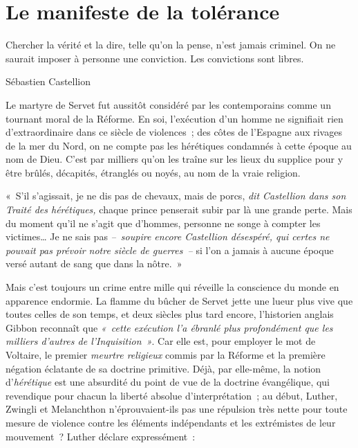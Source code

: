 \documentclass[french,twoside]{book} %
\newcommand{\bibl}[1]{{\smallskip\RaggedLeft\normalsize\normalfont #1\par\medskip}}}
\newenvironment{epigraph}{\begin{addmargin}[2\parindent]{0em}\sffamily\large\setstretch{0.95}}{\end{addmargin}\bigskip}
\newenvironment{quoteblock}%
  {\begin{quoting}}
  {\end{quoting}}
\newcommand\chapteropen{} %
\newcommand\chaptercont{} %
\newenvironment{quotebar}{%
    \def\FrameCommand{{\color{rubric!10!}\vrule width 0.5em} \hspace{0.9em}}%
    \def\OuterFrameSep{0pt} %
    \MakeFramed {\advance\hsize-\width \FrameRestore}
  }%
  {%
    \endMakeFramed
  }
\renewenvironment{quoteblock}%
  {%
    \savenotes
    \setstretch{0.9}
    \normalfont
    \begin{quotebar}
  }
  {%
    \end{quotebar}
    \spewnotes
  }
\begin{document}
\chapteropen

\chapter[{Le manifeste de la tolérance}]{Le manifeste de la tolérance}
\renewcommand{\leftmark}{Le manifeste de la tolérance}


\begin{epigraph}
\noindent Chercher la vérité et la dire, telle qu’on la pense, n’est jamais criminel. On ne saurait imposer à personne une conviction. Les convictions sont libres.\par

\bibl{Sébastien Castellion}
\end{epigraph}


\chaptercont
\noindent Le martyre de Servet fut aussitôt considéré par les contemporains comme un tournant moral de la Réforme. En soi, l’exécution d’un homme ne signifiait rien d’extraordinaire dans ce siècle de violences ; des côtes de l’Espagne aux rivages de la mer du Nord, on ne compte pas les hérétiques condamnés à cette époque au nom de Dieu. C’est par milliers qu’on les traîne sur les lieux du supplice pour y être brûlés, décapités, étranglés ou noyés, au nom de la vraie religion.\par

\begin{quoteblock}
\noindent « S’il s’agissait, je ne dis pas de chevaux, mais de porcs, \emph{dit Castellion dans son \emph{Traité des hérétiques}, }chaque prince penserait subir par là une grande perte. Mais du moment qu’il ne s’agit que d’hommes, personne ne songe à compter les victimes… Je ne sais pas \emph{– soupire encore Castellion désespéré, qui certes ne pouvait pas prévoir notre siècle de guerres –} si l’on a jamais à aucune époque versé autant de sang que dans la nôtre. »\end{quoteblock}

\noindent Mais c’est toujours un crime entre mille qui réveille la conscience du monde en apparence endormie. La flamme du bûcher de Servet jette une lueur plus vive que toutes celles de son temps, et deux siècles plus tard encore, l’historien anglais Gibbon reconnaît que \emph{« cette exécution l’a ébranlé plus profondément que les milliers d’autres de l’Inquisition »}. Car elle est, pour employer le mot de Voltaire, le premier \emph{meurtre religieux} commis par la Réforme et la première négation éclatante de sa doctrine primitive. Déjà, par elle-même, la notion d’\emph{hérétique} est une absurdité du point de vue de la doctrine évangélique, qui revendique pour chacun la liberté absolue d’interprétation ; au début, Luther, Zwingli et Melanchthon n’éprouvaient-ils pas une répulsion très nette pour toute mesure de violence contre les éléments indépendants et les extrémistes de leur mouvement ? Luther déclare expressément :\par
\end{document}
